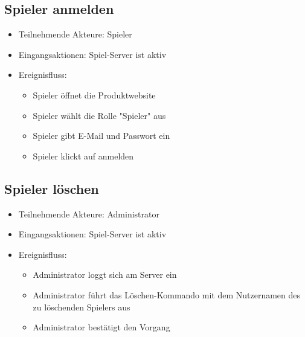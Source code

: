 \documentclass[a4paper]{scrreprt}
\begin{document}
    \subsection{Spieler anmelden}
    \begin{itemize}
        \item Teilnehmende Akteure: \Gls{Spieler}
        \item Eingangsaktionen: \Gls{Spiel-Server} ist aktiv
        \item Ereignisfluss:
        \begin{itemize}
            \item \Gls{Spieler} öffnet die Produktwebsite
            \item \Gls{Spieler} wählt die Rolle "\Gls{Spieler}" aus
            \item \Gls{Spieler} gibt E-Mail und Passwort ein
            \item \Gls{Spieler} klickt auf anmelden
        \end{itemize}
    \end{itemize}

    \subsection{Spieler löschen}
    \begin{itemize}
        \item Teilnehmende Akteure: \Gls{Administrator}
        \item Eingangsaktionen: \Gls{Spiel-Server} ist aktiv
        \item Ereignisfluss:
        \begin{itemize}
            \item \Gls{Administrator} loggt sich am Server ein
            \item \Gls{Administrator} führt das Löschen-Kommando mit dem Nutzernamen des zu löschenden \Gls{Spieler}s aus
            \item \Gls{Administrator} bestätigt den Vorgang
        \end{itemize}
    \end{itemize}
\end{document}
